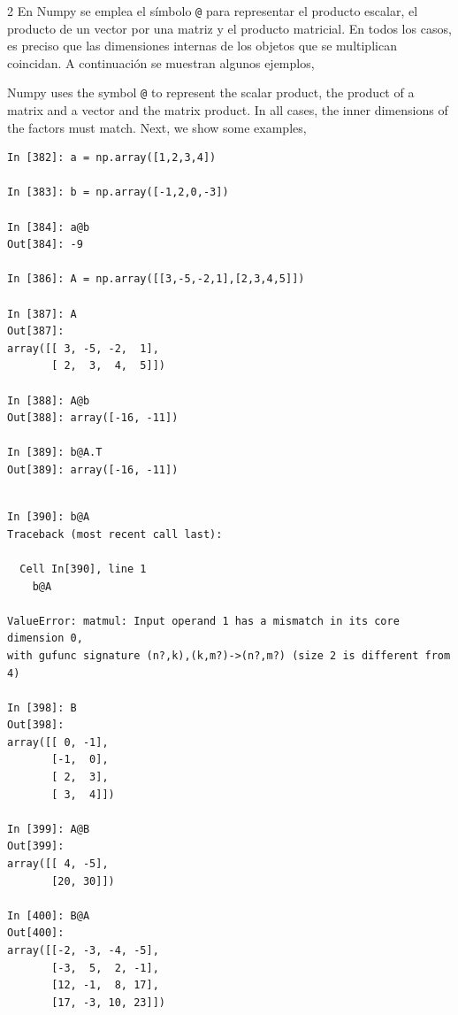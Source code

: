\begin{paracol}{2}
En Numpy se emplea el símbolo \texttt{@} para representar el producto escalar, el producto de un vector por una matriz y el producto matricial. En todos los casos, es preciso que las dimensiones internas de los objetos que se multiplican coincidan. A continuación se muestran algunos ejemplos,

\switchcolumn
Numpy uses the symbol \texttt{@} to represent the scalar product, the product of a matrix and a vector and the matrix product. In all cases, the inner dimensions of the factors must match. Next, we show some examples, 
\end{paracol}
\begin{center}
    \begin{minipage}{0.7\textwidth}
        \begin{verbatim}
In [382]: a = np.array([1,2,3,4])

In [383]: b = np.array([-1,2,0,-3])

In [384]: a@b
Out[384]: -9

In [386]: A = np.array([[3,-5,-2,1],[2,3,4,5]])

In [387]: A
Out[387]: 
array([[ 3, -5, -2,  1],
       [ 2,  3,  4,  5]])

In [388]: A@b
Out[388]: array([-16, -11])

In [389]: b@A.T
Out[389]: array([-16, -11])

        \end{verbatim}
    \end{minipage}
\end{center}
        
\begin{center}
    \begin{minipage}{0.7\textwidth}
        \begin{verbatim}
        
In [390]: b@A
Traceback (most recent call last):

  Cell In[390], line 1
    b@A

ValueError: matmul: Input operand 1 has a mismatch in its core dimension 0, 
with gufunc signature (n?,k),(k,m?)->(n?,m?) (size 2 is different from 4)

In [398]: B
Out[398]: 
array([[ 0, -1],
       [-1,  0],
       [ 2,  3],
       [ 3,  4]])

In [399]: A@B
Out[399]: 
array([[ 4, -5],
       [20, 30]])

In [400]: B@A
Out[400]: 
array([[-2, -3, -4, -5],
       [-3,  5,  2, -1],
       [12, -1,  8, 17],
       [17, -3, 10, 23]])
        \end{verbatim}
    \end{minipage}
\end{center}

